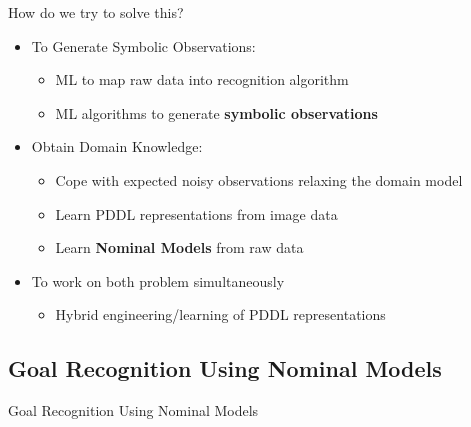 \documentclass[usenames,dvipsnames]{beamer}
\begin{document}
\begin{frame}[c]{How do we try to solve this?}
	\begin{itemize}
		\item To Generate Symbolic Observations:
		\begin{itemize}
			\item ML to map raw data into recognition algorithm {\Large \checkmark}
			\item ML algorithms to generate \textbf{symbolic observations} 
		\end{itemize}
		\item Obtain Domain Knowledge:
		\begin{itemize}
			\item Cope with expected noisy observations relaxing the domain model {\Large \checkmark}
			\item Learn PDDL representations from image data {\Large \color{red} \checkmark}
			\item Learn \textbf{Nominal Models} from raw data
		\end{itemize}
		\item To work on both problem simultaneously
		\begin{itemize}
			\item Hybrid engineering/learning of PDDL representations 
		\end{itemize}
	\end{itemize}
\end{frame}

\subsection{Goal Recognition Using Nominal Models}

\begin{frame}[c]
	\begin{center}
		\Large{Goal Recognition Using Nominal Models}
	\end{center}
\end{frame}
\end{document}
